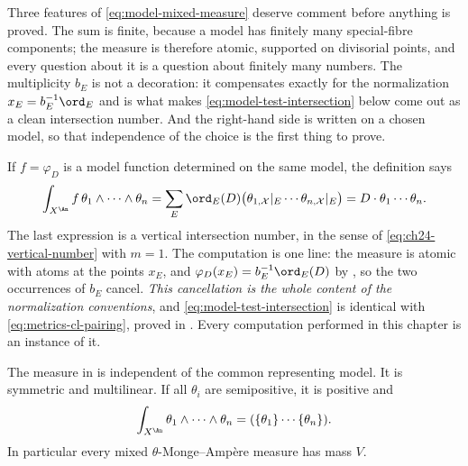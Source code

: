 Three features of \eqref{eq:model-mixed-measure} deserve comment before
anything is proved.  The sum is finite, because a model has finitely many
special-fibre components; the measure is therefore atomic, supported on
divisorial points, and every question about it is a question about finitely
many numbers.  The multiplicity $b_E$ is not a decoration: it compensates
exactly for the normalization $x_E=b_E^{-1}\ord_E$ and is what makes
\eqref{eq:model-test-intersection} below come out as a clean intersection
number.  And the right-hand side is written on a chosen model, so that
independence of the choice is the first thing to prove.

If $f=\varphi_D$ is a model function determined on the same model, the
definition says
\begin{equation}
\label{eq:model-test-intersection}
 \int_{X^{\An}}f\,\theta_1\wedge\cdots\wedge\theta_n
 =\sum_E\ord_E(D)
   \bigl(\theta_{1,\mathcal X}|_E\cdots
         \theta_{n,\mathcal X}|_E\bigr)
 =D\cdot\theta_1\cdots\theta_n.
\end{equation}
The last expression is a vertical intersection number, in the sense of
\eqref{eq:ch24-vertical-number} with $m=1$.  The computation is one line:
the measure is atomic with atoms at the points $x_E$, and
$\varphi_D(x_E)=b_E^{-1}\ord_E(D)$ by
, so the two occurrences of
$b_E$ cancel.  \emph{This cancellation is the whole content of the
normalization conventions}, and \eqref{eq:model-test-intersection} is
identical with \eqref{eq:metrics-cl-pairing}, proved in
.  Every computation performed
in this chapter is an instance of it.

\begin{proposition}\label{prop:model-ma-basic}
The measure in  is independent of
the common representing model. It is symmetric and multilinear. If all
$\theta_i$ are semipositive, it is positive and
\begin{equation}
\label{eq:mixed-total-mass}
  \int_{X^{\An}}\theta_1\wedge\cdots\wedge\theta_n
  =(\{\theta_1\}\cdots\{\theta_n\}).
\end{equation}
In particular every mixed $\theta$-Monge--Amp\`ere measure has mass $V$.
\end{proposition}


